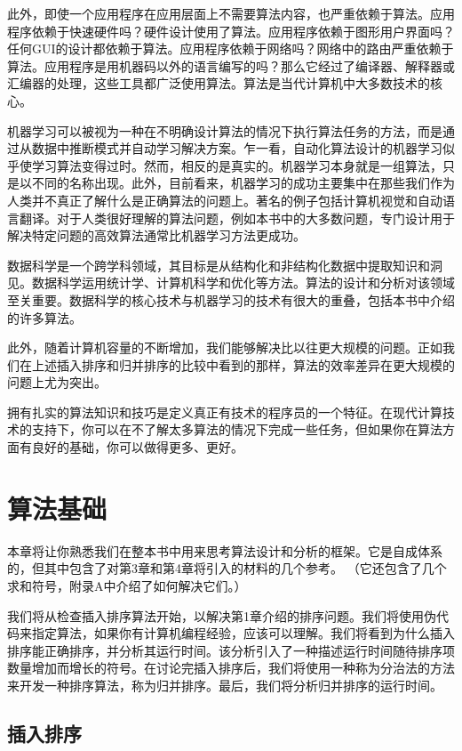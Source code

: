 \documentclass[lang=cn,newtx,10pt,scheme=chinese]{elegantbook}
\begin{document}
此外，即使一个应用程序在应用层面上不需要算法内容，也严重依赖于算法。应用程序依赖于快速硬件吗？硬件设计使用了算法。应用程序依赖于图形用户界面吗？任何GUI的设计都依赖于算法。应用程序依赖于网络吗？网络中的路由严重依赖于算法。应用程序是用机器码以外的语言编写的吗？那么它经过了编译器、解释器或汇编器的处理，这些工具都广泛使用算法。算法是当代计算机中大多数技术的核心。

机器学习可以被视为一种在不明确设计算法的情况下执行算法任务的方法，而是通过从数据中推断模式并自动学习解决方案。乍一看，自动化算法设计的机器学习似乎使学习算法变得过时。然而，相反的是真实的。机器学习本身就是一组算法，只是以不同的名称出现。此外，目前看来，机器学习的成功主要集中在那些我们作为人类并不真正了解什么是正确算法的问题上。著名的例子包括计算机视觉和自动语言翻译。对于人类很好理解的算法问题，例如本书中的大多数问题，专门设计用于解决特定问题的高效算法通常比机器学习方法更成功。

数据科学是一个跨学科领域，其目标是从结构化和非结构化数据中提取知识和洞见。数据科学运用统计学、计算机科学和优化等方法。算法的设计和分析对该领域至关重要。数据科学的核心技术与机器学习的技术有很大的重叠，包括本书中介绍的许多算法。

此外，随着计算机容量的不断增加，我们能够解决比以往更大规模的问题。正如我们在上述插入排序和归并排序的比较中看到的那样，算法的效率差异在更大规模的问题上尤为突出。

拥有扎实的算法知识和技巧是定义真正有技术的程序员的一个特征。在现代计算技术的支持下，你可以在不了解太多算法的情况下完成一些任务，但如果你在算法方面有良好的基础，你可以做得更多、更好。

\chapter{算法基础}

本章将让你熟悉我们在整本书中用来思考算法设计和分析的框架。它是自成体系的，但其中包含了对第3章和第4章将引入的材料的几个参考。 （它还包含了几个求和符号，附录A中介绍了如何解决它们。）

我们将从检查插入排序算法开始，以解决第1章介绍的排序问题。我们将使用伪代码来指定算法，如果你有计算机编程经验，应该可以理解。我们将看到为什么插入排序能正确排序，并分析其运行时间。该分析引入了一种描述运行时间随待排序项数量增加而增长的符号。在讨论完插入排序后，我们将使用一种称为分治法的方法来开发一种排序算法，称为归并排序。最后，我们将分析归并排序的运行时间。

\section{插入排序}
\end{document}
